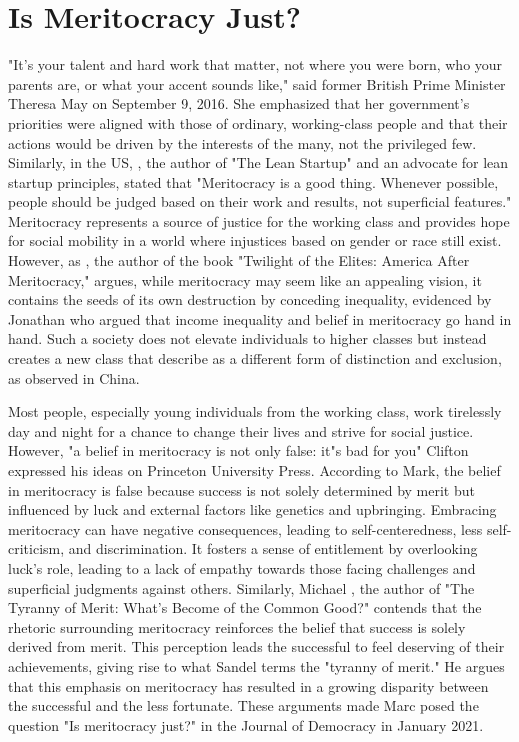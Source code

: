 \section{Is Meritocracy Just?}
"It's your talent and hard work that matter, not where you were born, who your parents are, or what your accent sounds like," said former British Prime Minister Theresa May on September 9, 2016. She emphasized that her government's priorities were aligned with those of ordinary, working-class people and that their actions would be driven by the interests of the many, not the privileged few. Similarly, in the US, \citet{ries2011lean}, the author of "The Lean Startup" and an advocate for lean startup principles, stated that "Meritocracy is a good thing. Whenever possible, people should be judged based on their work and results, not superficial features." Meritocracy represents a source of justice for the working class and provides hope for social mobility in a world where injustices based on gender \citep{belingheri2021twenty} or race \citep{becares2015understanding} still exist. However, as \citet{hayes2013twilight}, the author of the book "Twilight of the Elites: America After Meritocracy," argues, while meritocracy may seem like an appealing vision, it contains the seeds of its own destruction by conceding inequality, evidenced by Jonathan \citet{mijs2021paradox} who argued that income inequality and belief in meritocracy go hand in hand. Such a society does not elevate individuals to higher classes but instead creates a new class that \citet{jin2020meritocracy} describe as a different form of distinction and exclusion, as observed in China.

Most people, especially young individuals from the working class, work tirelessly day and night for a chance to change their lives and strive for social justice. However, "a belief in meritocracy is not only false: it"s bad for you" Clifton \citet{mark2020belief} expressed his ideas on Princeton University Press. According to Mark, the belief in meritocracy is false because success is not solely determined by merit but influenced by luck and external factors like genetics and upbringing. Embracing meritocracy can have negative consequences, leading to self-centeredness, less self-criticism, and discrimination. It fosters a sense of entitlement by overlooking luck's role, leading to a lack of empathy towards those facing challenges and superficial judgments against others. Similarly, Michael \citet{sandel2020tyranny}, the author of "The Tyranny of Merit: What's Become of the Common Good?" contends that the rhetoric surrounding meritocracy reinforces the belief that success is solely derived from merit. This perception leads the successful to feel deserving of their achievements, giving rise to what Sandel terms the "tyranny of merit." He argues that this emphasis on meritocracy has resulted in a growing disparity between the successful and the less fortunate. These arguments made Marc \citet{plattner2021tyranny} posed the question "Is meritocracy just?" in the Journal of Democracy in January 2021.

